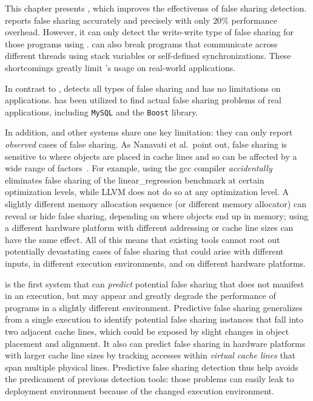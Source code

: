 \label{chapter:preditor}

This chapter presents \Predator{}, which improves the effectivenss of false sharing detection. \SheriffDetect{} reports false sharing accurately and precisely with only $20\%$ performance overhead. However, it can only detect the write-write type of false sharing for those programs using \pthreads{}. \SheriffDetect{} can also break programs that communicate across different threads using stack variables or self-defined synchronizations. These shortcomings greatly limit \SheriffDetect{}'s usage on real-world applications.  

In contrast to \SheriffDetect{}, \Predator{} detects all types of false sharing and has no limitations on applications. \Predator{} has been utilized to find actual false sharing problems of real applications, including \texttt{MySQL} and the \texttt{Boost} library.

In addition, \SheriffDetect{} and other systems share one key limitation: they can only report \emph{observed} cases of false sharing. As Nanavati et al.\ point out, false sharing is sensitive to where objects are placed in cache lines and so can be affected by a wide range of factors~\cite{OSdetection}. For example, using the gcc compiler \emph{accidentally} eliminates false sharing of the linear\_regression benchmark at certain optimization levels, while LLVM does not do so at any optimization level.  A slightly different memory allocation sequence (or different memory allocator) can reveal or hide false sharing, depending on where objects end up in memory; using a different hardware platform with different addressing or cache line sizes can have the same effect. All of this means that existing tools cannot root out potentially devastating cases of false sharing that could arise with different inputs, in different execution environments, and on different hardware platforms.

\Predator{} is the first system that can \emph{predict} potential false sharing that does not manifest in an execution, but may appear and greatly degrade the performance of programs in a slightly different environment. Predictive false sharing generalizes from a single execution to identify potential false sharing instances that fall into two adjacent cache lines, which could be exposed by slight changes in object placement and alignment. It also can predict false sharing in hardware platforms with larger cache line sizes by tracking accesses within \emph{virtual cache lines} that span multiple physical lines. Predictive false sharing detection thus help avoids the predicament of previous detection tools: those problems can easily leak to deployment environment because of the changed execution environment.


